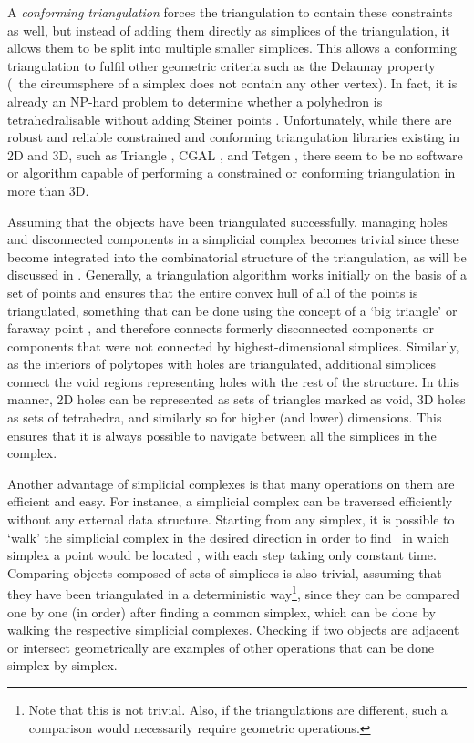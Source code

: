 A \emph{conforming triangulation} forces the triangulation to contain these constraints as well, but instead of adding them directly as simplices of the triangulation, it allows them to be split into multiple smaller simplices.
This allows a conforming triangulation to fulfil other geometric criteria such as the Delaunay property (\ie\ the circumsphere of a simplex does not contain any other vertex).
In fact, it is already an NP-hard problem to determine whether a polyhedron is tetrahedralisable without adding Steiner points \citep{Ruppert92}.
Unfortunately, while there are robust and reliable constrained and conforming triangulation libraries existing in 2D and 3D, such as Triangle \citep{Shewchuk96}, CGAL \citep{Boissonnat02}, and Tetgen \citep{Si05}, there seem to be no software or algorithm capable of performing a constrained or conforming triangulation in more than 3D.

Assuming that the objects have been triangulated successfully, managing holes and disconnected components in a simplicial complex becomes trivial since these become integrated into the combinatorial structure of the triangulation, as will be discussed in .
Generally, a triangulation algorithm works initially on the basis of a set of points and ensures that the entire convex hull of all of the points is triangulated, something that can be done using the concept of a `big triangle' or faraway point \citep{Liu08}, and therefore connects formerly disconnected components or components that were not connected by highest-dimensional simplices.
Similarly, as the interiors of polytopes with holes are triangulated, additional simplices connect the void regions representing holes with the rest of the structure.
In this manner, 2D holes can be represented as sets of triangles marked as void, 3D holes as sets of tetrahedra, and similarly so for higher (and lower) dimensions.
This ensures that it is always possible to navigate between all the simplices in the complex.

Another advantage of simplicial complexes is that many operations on them are efficient and easy.
For instance, a simplicial complex can be traversed efficiently without any external data structure.
Starting from any simplex, it is possible to `walk' the simplicial complex in the desired direction in order to find \eg\ in which simplex a point would be located \citep{Devillers02a}, with each step taking only constant time.
Comparing objects composed of sets of simplices is also trivial, assuming that they have been triangulated in a deterministic way\footnote{Note that this is not trivial. Also, if the triangulations are different, such a comparison would necessarily require geometric operations.}, since they can be compared one by one (in order) after finding a common simplex, which can be done by walking the respective simplicial complexes.
Checking if two objects are adjacent or intersect geometrically are examples of other operations that can be done simplex by simplex.

